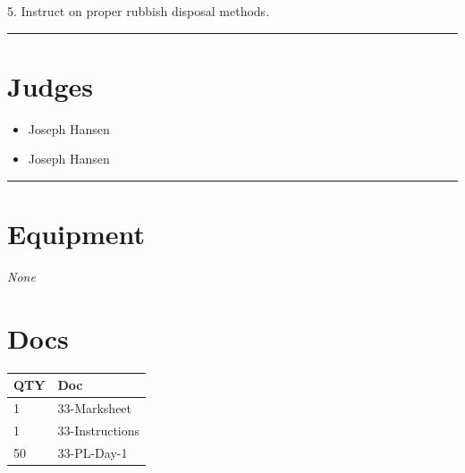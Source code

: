 \documentclass[10pt]{article}
\begin{document}
5. Instruct on proper rubbish disposal methods.
\vspace{0.5cm}
	\hrule
	\vspace{0.5cm}
		\section*{\faUsers \: Judges}

		

	\begin{multicols}{2}

		\begin{itemize}
									\item Joseph Hansen
						\end{itemize}

		\vfill\null
		\columnbreak

		\begin{itemize}
									\item Joseph Hansen
						\end{itemize}

		\vfill\null

		\end{multicols}



			\vspace{0.5cm}
	\hrule
	\vspace{0.5cm}

	\begin{multicols}{2}

		\section*{\faWrench \: Equipment}

				\textit{None}
		
		\vfill\null
		\columnbreak

			\section*{\faFile \: Docs}
		 	\begin{center}
			\begin{tabular}{p{2cm}p{4cm}}

			\textbf{QTY} & \textbf{Doc} \\\toprule
										1&33-Marksheet\\\midrule
										1&33-Instructions\\\midrule
										50&33-PL-Day-1\\\midrule
							\end{tabular}
			\end{center}
	

		\vfill\null

		\end{multicols}
\end{document}
